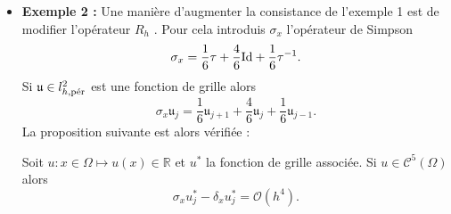 \begin{itemize}
\item \textbf{Exemple 2 :} Une manière d'augmenter la consistance de l'exemple 1 est de modifier l'opérateur $R_h$ \cite{Collatz2012}. Pour cela introduis $\sigma_x$ l'opérateur de Simpson
\begin{equation}
\sigma_x = \dfrac{1}{6} \tau + \dfrac{4}{6} \Id + \dfrac{1}{6} \tau^{-1}.
\end{equation}
Si $\mathfrak{u} \in l^2_{h,\per}$ est une fonction de grille alors
\begin{equation}
\sigma_x \mathfrak{u}_j = \dfrac{1}{6} \mathfrak{u}_{j+1} + \dfrac{4}{6} \mathfrak{u}_j + \dfrac{1}{6} \mathfrak{u}_{j-1} .
\end{equation}
La proposition suivante est alors vérifiée :
\begin{proposition}
Soit $u : x \in \Omega \mapsto u(x) \in \mathbb{R}$ et $u^*$ la fonction de grille associée. Si $u \in \mathcal{C}^5(\Omega)$ alors 
\begin{equation}
\sigma_x u^*_j - \delta_x u^*_j = \mathcal{O}(h^4).
\end{equation}
\label{prop:eq_deltax2_sigmax}
\end{proposition}


\end{itemize}
